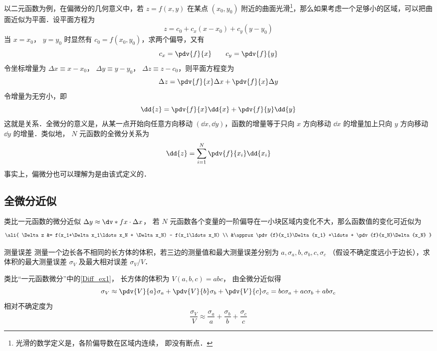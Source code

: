 

以二元函数为例，在偏微分的几何意义中，若 $z = f(x,y)$ 在某点 $(x_0, y_0)$ 附近的曲面光滑\footnote{光滑的数学定义是，各阶偏导数在区域内连续， 即没有断点．}，那么如果考虑一个足够小的区域，可以把曲面近似为平面．设平面方程为
\begin{equation}
z = c_0 + c_x(x - x_0) + c_y(y - y_0)
\end{equation}
当 $x=x_0$， $y=y_0$ 时显然有 $c_0 = f(x_0, y_0)$，求两个偏导，又有
\begin{equation}
c_x = \pdv{f}{x} \qquad c_y = \pdv{f}{y}
\end{equation}
令坐标增量为 $\Delta x \equiv x - x_0$， $\Delta y \equiv y - y_0$，  $\Delta z \equiv z - c_0$，则平面方程变为
\begin{equation}
\Delta z = \pdv{f}{x}\Delta x + \pdv{f}{x}\Delta y
\end{equation}
令增量为无穷小，即
 \begin{equation}
\dd{z} = \pdv{f}{x} \dd{x} + \pdv{f}{y} \dd{y}
\end{equation}
这就是关系．全微分的意义是，从某一点开始向任意方向移动 $(\dd{x}, \dd{y})$，函数的增量等于只向 $x$ 方向移动 $\dd{x}$ 的增量加上只向 $y$ 方向移动 $\dd{y}$ 的增量．类似地， $N$ 元函数的全微分关系为
\begin{equation}
\dd{z} = \sum_{i = 1}^{N} \pdv{f}{x_i} \dd{x_i}
\end{equation}
事实上，偏微分也可以理解为是由该式定义的．

\subsection{全微分近似}
类比一元函数的微分近似 $\Delta y \approx \dv*{f}{x} \cdot \Delta x$， 若 $N$ 元函数各个变量的一阶偏导在一小块区域内变化不大，那么函数值的变化可近似为
\begin{equation}\label{TDiff_eq6}\ali{
\Delta z &= f(x_1+\Delta x_1\ldots x_N + \Delta x_N) - f(x_1\ldots x_N) \\
&\approx \pdv{f}{x_1}\Delta {x_1} +\ldots + \pdv{f}{x_N}\Delta {x_N}
}\end{equation}

\begin{exam}{测量误差}
测量一个边长各不相同的长方体的体积，若三边的测量值和最大测量误差分别为 $a, \sigma_a, b, \sigma_b, c, \sigma_c$ （假设不确定度远小于边长），求体积的最大测量误差 $\sigma_V$ 及最大相对误差 $\sigma_V/V$．

类比“一元函数微分”中的\autoref{Diff_ex1}， 长方体的体积为 $V(a,b,c) = abc$， 由全微分近似得
\begin{equation}
\sigma _V \approx \pdv{V}{a} \sigma _a + \pdv{V}{b} \sigma _b + \pdv{V}{c} \sigma _c = bc \sigma _a + ac \sigma _b + ab \sigma _c
\end{equation}
相对不确定度为
\begin{equation}
\frac{\sigma _V}{V} \approx \frac{\sigma _a}{a} + \frac{\sigma _b}{b} + \frac{\sigma _c}{c}
\end{equation}
\end{exam}
